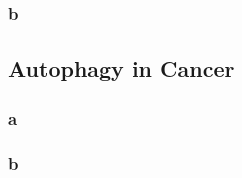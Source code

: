         \subsubsection{b}


        
        
        
        
        
    \subsection{Autophagy in Cancer}
        \subsubsection{a}
        \subsubsection{b}
        
        
        



